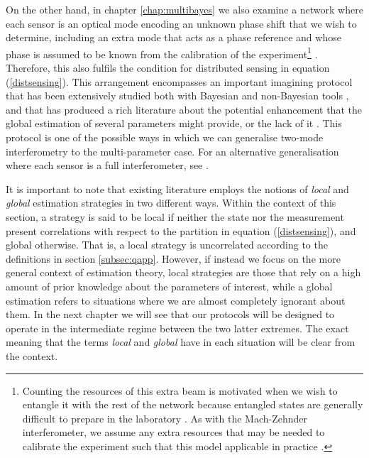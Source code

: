 On the other hand, in chapter \ref{chap:multibayes} we also examine a network where each sensor is an optical mode encoding an unknown phase shift that we wish to determine, including an extra mode that acts as a phase reference and whose phase is assumed to be known from the calibration of the experiment\footnote{Counting the resources of this extra beam is motivated when we wish to entangle it with the rest of the network because entangled states are generally difficult to prepare in the laboratory \cite{proctor2017networked}. As with the Mach-Zehnder interferometer, we assume any extra resources that may be needed to calibrate the experiment such that this model applicable in practice \cite{jarzyna2012, proctor2017networked}.} \cite{proctor2017networked}. Therefore, this also fulfils the condition for distributed sensing in equation (\ref{distsensing}). This arrangement encompasses an important imagining protocol that has been extensively studied both with Bayesian \cite{chiara2003, spagnolo2012} and non-Bayesian tools \cite{spagnolo2012, humphreys2013}, and that has produced a rich literature about the potential enhancement that the global estimation of several parameters might provide, or the lack of it \cite{humphreys2013, knott2016local, proctor2017networked, proctor2017networkedshort, altenburg2018}. This protocol is one of the possible ways in which we can generalise two-mode interferometry to the multi-parameter case. For an alternative generalisation where each sensor is a full interferometer, see \cite{knott2016local}.

It is important to note that existing literature employs the notions of \emph{local} and \emph{global} estimation strategies in two different ways. Within the context of this section, a strategy is said to be local if neither the state nor the measurement present correlations with respect to the partition in equation (\ref{distsensing}), and global otherwise. That is, a local strategy is uncorrelated according to the definitions in section \ref{subsec:qapp}. However, if instead we focus on the more general context of estimation theory, local strategies are those that rely on a high amount of prior knowledge about the parameters of interest, while a global estimation refers to situations where we are almost completely ignorant about them. In the next chapter we will see that our protocols will be designed to operate in the intermediate regime between the two latter extremes. The exact meaning that the terms \emph{local} and \emph{global} have in each situation will be clear from the context.   

